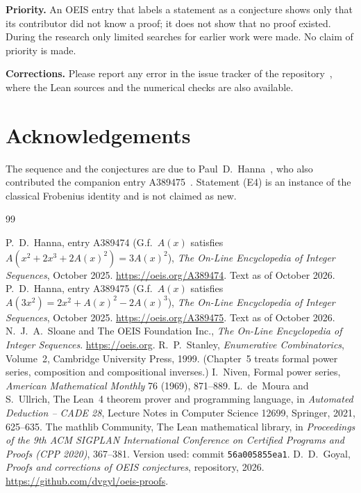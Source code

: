 \documentclass[11pt,a4paper]{article}
\theoremstyle{definition}
\theoremstyle{remark}
\newcommand{\para}[1]{\par\medskip\noindent\textbf{#1}\enspace}
\begin{document}
\para{Priority.} An OEIS entry that labels a statement as a conjecture shows only that its contributor did not know
a proof; it does not show that no proof existed. During the research only limited searches for earlier work were
made. No claim of priority is made.

\para{Corrections.} Please report any error in the issue tracker of the repository~\cite{repo}, where the Lean sources and the numerical checks are also
available.

\section*{Acknowledgements}
The sequence and the conjectures are due to Paul~D.~Hanna~\cite{oeis}, who also contributed the companion entry
A389475~\cite{oeisother}. Statement (E4) is an instance of the classical Frobenius identity and is not claimed as new.

\begin{thebibliography}{99}\small
\raggedright
{} P.~D.~Hanna, entry A389474 (G.f.\ $A(x)$ satisfies $A(x^2+2x^3+2A(x)^2)=3A(x)^2$), \emph{The On-Line Encyclopedia of Integer Sequences}, October 2025. \url{https://oeis.org/A389474}. Text as of October 2026.
 P.~D.~Hanna, entry A389475 (G.f.\ $A(x)$ satisfies $A(3x^2)=2x^2+A(x)^2-2A(x)^3$), \emph{The On-Line Encyclopedia of Integer Sequences}, October 2025. \url{https://oeis.org/A389475}. Text as of October 2026.
 N.~J.~A.~Sloane and The OEIS Foundation Inc., \emph{The On-Line Encyclopedia of Integer Sequences}. \url{https://oeis.org}.
 R.~P.~Stanley, \emph{Enumerative Combinatorics}, Volume~2, Cambridge University Press, 1999. (Chapter~5 treats formal power series, composition and compositional inverses.)
 I.~Niven, Formal power series, \emph{American Mathematical Monthly} 76 (1969), 871--889.
 L.~de~Moura and S.~Ullrich, The Lean~4 theorem prover and programming language, in \emph{Automated Deduction -- CADE 28}, Lecture Notes in Computer Science 12699, Springer, 2021, 625--635.
 The mathlib Community, The Lean mathematical library, in \emph{Proceedings of the 9th ACM SIGPLAN International Conference on Certified Programs and Proofs (CPP 2020)}, 367--381. Version used: commit \texttt{56a005855ea1}.
 D.~D.~Goyal, \emph{Proofs and corrections of OEIS conjectures}, repository, 2026. \url{https://github.com/dvgyl/oeis-proofs}.
\end{thebibliography}
\end{document}
